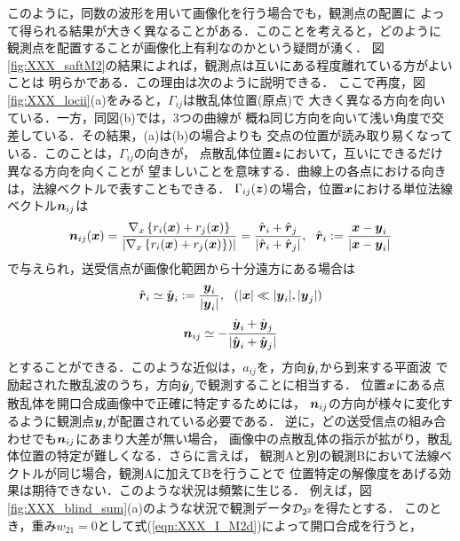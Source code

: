 このように，同数の波形を用いて画像化を行う場合でも，観測点の配置に
よって得られる結果が大きく異なることがある．このことを考えると，どのように
観測点を配置することが画像化上有利なのかという疑問が湧く．
図\ref{fig:XXX_saftM2}の結果によれば，観測点は互いにある程度離れている方がよいことは
明らかである．この理由は次のように説明できる．
ここで再度，図\ref{fig:XXX_locii}(a)をみると，$\Gamma_{ij}$は散乱体位置(原点)で
大きく異なる方向を向いている．一方，同図(b)では，3つの曲線が
概ね同じ方向を向いて浅い角度で交差している．その結果，(a)は(b)の場合よりも
交点の位置が読み取り易くなっている．このことは，$\Gamma_{ij}$の向きが，
点散乱体位置$\mbox{\boldmath $z$}$において，互いにできるだけ異なる方向を向くことが
望ましいことを意味する．曲線上の各点における向きは，法線ベクトルで表すこともできる．
$\Gamma_{ij}(\mbox{\boldmath $z$})$の場合，位置$\mbox{\boldmath $x$}$における単位法線ベクトル$\mbox{\boldmath $n$}_{ij}$は
\begin{equation}
	\fat{n}_{ij}(\fat{x}) 
	=\frac{\nabla_x \left\{ r_i(\fat{x})+r_j(\fat{x})\right\}}
	{\left| \nabla_x \left\{r_i(\fat{x})+r_j(\fat{x})\right\})\right|}
	=\frac{
		\hat{\fat{r}}_i+\hat{\fat{r}}_j
	}{
		\left| \hat{\fat{r}}_i+\hat{\fat{r}}_j \right|
	}
	, \ \ 
	\hat{\fat{r}}_i:=
	\frac{\fat{x}-\fat{y}_i}
	{\left| \fat{x} -\fat{y}_i\right|}
	\label{eqn:XXX_08}
\end{equation}
で与えられ，送受信点が画像化範囲から十分遠方にある場合は
\begin{equation}
	\hat{\mbox{\boldmath $r$}}_i\simeq \hat{\mbox{\boldmath $y$}}_i:= \frac{\mbox{\boldmath $y$}_i}{|\mbox{\boldmath $y$}_i|}
	, \ \ (|\mbox{\boldmath $x$}|\ll |\mbox{\boldmath $y$}_i|,|\mbox{\boldmath $y$}_j|)
	\label{eqn:XXX_09}
\end{equation}
\begin{equation}
	\mbox{\boldmath $n$}_{ij} \simeq  
	-\frac{\hat{\mbox{\boldmath $y$}}_i+\hat{\mbox{\boldmath $y$}}_j}
	{| \hat{\mbox{\boldmath $y$}}_i+\hat{\mbox{\boldmath $y$}}_j|}
	\label{eqn:XXX_10}
\end{equation}
とすることができる．このような近似は，$a_{ij}$を，方向$\hat{\mbox{\boldmath $y$}}_i$から到来する平面波
で励起された散乱波のうち，方向$\hat{\mbox{\boldmath $y$}}_j$で観測することに相当する．
位置$\mbox{\boldmath $x$}$にある点散乱体を開口合成画像中で正確に特定するためには，
$\mbox{\boldmath $n$}_{ij}$の方向が様々に変化するように観測点$\mbox{\boldmath $y$}_i$が配置されている必要である．
逆に，どの送受信点の組み合わせでも$\mbox{\boldmath $n$}_{ij}$にあまり大差が無い場合，
画像中の点散乱体の指示が拡がり，散乱体位置の特定が難しくなる．さらに言えば，
観測Aと別の観測Bにおいて法線ベクトルが同じ場合，観測Aに加えてBを行うことで
位置特定の解像度をあげる効果は期待できない．このような状況は頻繁に生じる．
例えば，図\ref{fig:XXX_blind_sum}(a)のような状況で観測データ${\cal D}_{2^2}$を得たとする．
このとき，重み$w_{21}=0$として式(\ref{eqn:XXX_I_M2d})によって開口合成を行うと，
